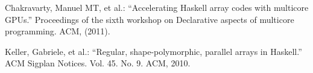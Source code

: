 \documentclass[runningheads,a4paper]{llncs}
\begin{document}
\begin{thebibliography}{4}
 Chakravarty, Manuel MT, et al.: ``Accelerating Haskell
  array codes with multicore GPUs.'' Proceedings of the sixth workshop on
  Declarative aspects of multicore programming. ACM, (2011).

 Keller, Gabriele, et al.: ``Regular, shape-polymorphic,
  parallel arrays in Haskell.'' ACM Sigplan Notices. Vol. 45. No. 9. ACM, 2010.
\end{thebibliography}
\end{document}
